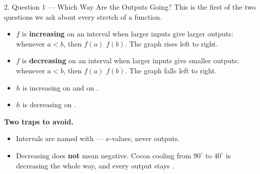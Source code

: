 \documentclass[10pt]{article}
\begin{document}
\boxguard[27]
\begin{notesbox}{2. Question 1 --- Which Way Are the Outputs Going?}
This is the first of the two questions we ask about every stretch of a
function.

\begin{itemize}[itemsep=4pt]
  \item $f$ is \textbf{increasing} on an interval when larger inputs give
        larger outputs: whenever $a < b$, then $f(a)$ \ans{$<$} $f(b)$.
        The graph rises left to right.
  \item $f$ is \textbf{decreasing} on an interval when larger inputs give
        smaller outputs: whenever $a < b$, then $f(a)$ \ans{$>$} $f(b)$.
        The graph falls left to right.
\end{itemize}

\begin{center}
\end{center}

\begin{itemize}[itemsep=4pt]
  \item $h$ is increasing on  and on .
  \item $h$ is decreasing on .
\end{itemize}

\textbf{Two traps to avoid.}
\begin{itemize}[itemsep=4pt]
  \item Intervals are named with  --- $x$-values, never outputs.
  \item Decreasing does \textbf{not} mean negative. Cocoa cooling from
        $90^\circ$ to $40^\circ$ is decreasing the whole way, and every
        output stays .
\end{itemize}
\end{notesbox}
\end{document}
